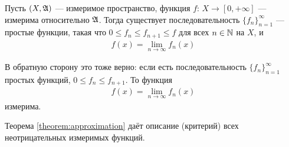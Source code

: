 
\begin{thm}[об аппроксимации]
 \label{theorem:approximation}
 Пусть $(X, \mathfrak{A})$ --- измеримое пространство, функция $f \colon\, X \to [0, +\infty]  $ --- измерима относительно $\mathfrak{A}$. Тогда существует последовательность $\{f_{n}\}_{n=1}^{\infty} $ --- простые функции, такая что $0 \leqslant f_n \leqslant f_{n+1} \leqslant f$ для всех $n \in \mathbb{N}$ на $X$, и \begin{align*}
  f(x) = \lim\limits_{n \to \infty} f_n(x)
 \end{align*} 
\end{thm}
\begin{remrk}
 В обратную сторону это тоже верно: если есть последовательность $\{f_{n}\}_{n=1}^{\infty} $ простых функций, $0 \leqslant f_n \leqslant f_{n+1}$. То функция \begin{align*}
  f(x) = \lim\limits_{n \to \infty} f_n(x)
 \end{align*} измерима.

 Теорема \ref{theorem:approximation} даёт описание (критерий) всех неотрицательных измеримых функций.
\end{remrk}
